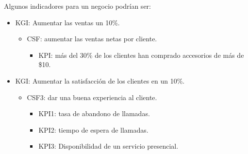 \begin{example}
Algunos indicadores para un negocio podrían ser:
\begin{itemize}
\item KGI: Aumentar las ventas un 10\%.
\begin{itemize}
\item CSF: aumentar las ventas netas por cliente.
\begin{itemize}
\item KPI: más del 30\% de los clientes han comprado accesorios de más de \$10.
\end{itemize}
\end{itemize}
\item KGI: Aumentar la satisfacción de los clientes en un 10\%.
\begin{itemize}
\item CSF3: dar una buena experiencia al cliente.
\begin{itemize}
\item KPI1: tasa de abandono de llamadas.
\item KPI2: tiempo de espera de llamadas.
\item KPI3: Disponibilidad de un servicio presencial.
\end{itemize}
\end{itemize}
\end{itemize}
\end{example}